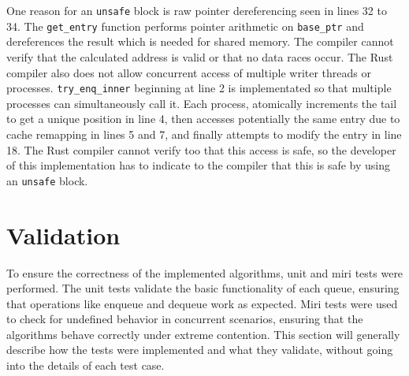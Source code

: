 One reason for an \texttt{unsafe} block is raw pointer dereferencing seen in lines 32 to 34. The \texttt{get\_entry} function performs pointer arithmetic on \texttt{base\_ptr} and dereferences the result which is needed for shared memory. The compiler cannot verify that the calculated address is valid or that no data races occur. The Rust compiler also does not allow concurrent access of multiple writer threads or processes. \texttt{try\_enq\_inner} beginning at line 2 is implementated so that multiple processes can simultaneously call it. Each process, atomically increments the tail to get a unique position in line 4, then accesses potentially the same entry due to cache remapping in lines 5 and 7, and finally attempts to modify the entry in line 18. The Rust compiler cannot verify too that this access is safe, so the developer of this implementation has to indicate to the compiler that this is safe by using an \texttt{unsafe} block.

\section{Validation}
To ensure the correctness of the implemented algorithms, unit and miri tests were performed. The unit tests validate the basic functionality of each queue, ensuring that operations like enqueue and dequeue work as expected. Miri tests were used to check for undefined behavior in concurrent scenarios, ensuring that the algorithms behave correctly under extreme contention. This section will generally describe how the tests were implemented and what they validate, without going into the details of each test case.